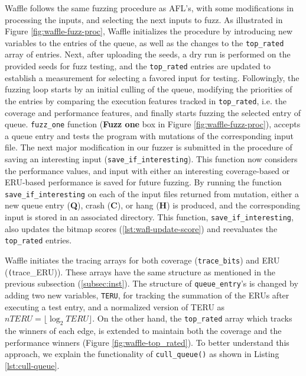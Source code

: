 Waffle follows the same fuzzing procedure as AFL's, with some modifications in processing the inputs, and selecting the next inputs to fuzz. As illustrated in Figure \ref{fig:waffle-fuzz-proc}, Waffle initializes the procedure by introducing new variables to the entries of the queue, as well as the changes to the \texttt{top\_rated} array of entries. Next, after uploading the seeds, a dry run is performed on the provided seeds for fuzz testing, and the \texttt{top\_rated} entries are updated to establish a measurement for selecting a favored input for testing. Followingly, the fuzzing loop starts by an initial culling of the queue, modifying the priorities of the entries by comparing the execution features tracked in \texttt{top\_rated}, i.e. the coverage and performance features, and finally starts fuzzing the selected entry of queue. \texttt{fuzz\_one} function (\textbf{Fuzz one} box in Figure \ref{fig:waffle-fuzz-proc}), accepts a queue entry and tests the program with mutations of the corresponding input file. The next major modification in our fuzzer is submitted in the procedure of saving an interesting input (\texttt{save\_if\_interesting}). This function now considers the performance values, and input with either an interesting coverage-based or ERU-based performance is saved for future fuzzing. By running the function \texttt{save\_if\_interesting} on each of the input files returned from mutation, either a new queue entry (\textbf{Q}), crash (\textbf{C}), or hang (\textbf{H}) is produced, and the corresponding input is stored in an associated directory. This function, \texttt{save\_if\_interesting}, also updates the bitmap scores (\ref{lst:wafl-update-score}) and reevaluates the \texttt{top\_rated} entries.




Waffle initiates the tracing arrays for both coverage (\texttt{trace\_bits}) and ERU (\texttt(trace\_ERU)). These arrays have the same structure as mentioned in the previous subsection (\ref{subsec:inst}). The structure of \texttt{queue\_entry}'s is changed by adding two new variables, \texttt{TERU}, for tracking the summation of the ERUs after executing a test entry, and a normalized version of TERU as $nTERU= \lfloor \log_{2} {TERU}\rfloor$. On the other hand, the \texttt{top\_rated} array which tracks the winners of each edge, is extended to maintain both the coverage and the performance winners (Figure \ref{fig:waffle-top_rated}). To better understand this approach, we explain the functionality of \texttt{cull\_queue()} as shown in Listing \ref{lst:cull-queue}.

